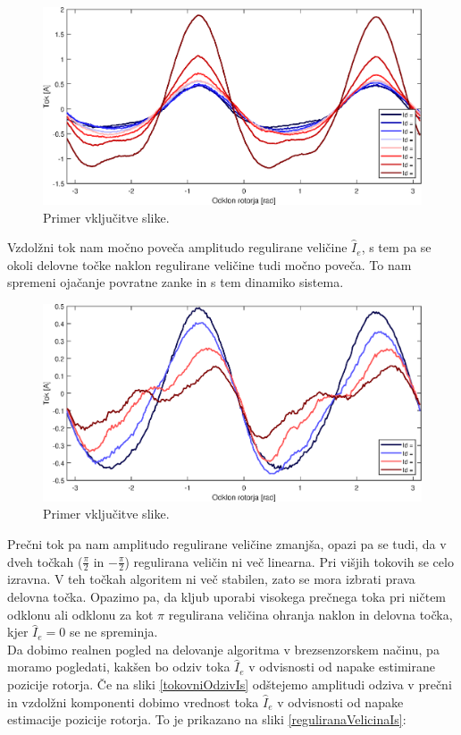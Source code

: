 \documentclass[a4paper,twoside,openright,12pt,slovene]{book}
\begin{document}
\begin{figure}[!htbp]
    \centering
    \includegraphics[width=1\columnwidth]{Slike/reguliranaVelicinaId.eps}
    \caption{\label{reguliranaVelicinaId} Primer vključitve slike.}
\end{figure}


Vzdolžni tok nam močno poveča amplitudo regulirane veličine $\hat{I}_{e}$, s tem pa se okoli delovne točke naklon regulirane veličine tudi močno poveča. To nam spremeni ojačanje povratne zanke in s
tem dinamiko sistema.

\begin{figure}[!htbp]
    \centering
    \includegraphics[width=01\columnwidth]{Slike/reguliranaVelicinaIq.eps}
    \caption{\label{reguliranaVelicinaIq} Primer vključitve slike.}
\end{figure}

Prečni tok pa nam amplitudo regulirane veličine zmanjša, opazi pa se tudi, da v dveh točkah ($\frac{\pi}{2}$ in $-\frac{\pi}{2}$) regulirana veličin ni več linearna. Pri višjih tokovih se celo izravna.
V teh točkah algoritem ni več stabilen, zato se mora izbrati prava delovna točka.
Opazimo pa, da kljub uporabi visokega prečnega toka pri ničtem odklonu ali odklonu za kot $\pi$ regulirana veličina ohranja naklon in delovna točka, kjer $\hat{I}_{e} = 0$ se ne spreminja.
\\
Da dobimo realnen pogled na delovanje algoritma v brezsenzorskem načinu, pa moramo pogledati, kakšen bo odziv toka $\hat{I}_{e}$ v odvisnosti od napake estimirane pozicije rotorja. Če na sliki
\ref{tokovniOdzivIs} odštejemo amplitudi odziva v prečni in vzdolžni komponenti dobimo vrednost toka $\hat{I}_{e}$ v odvisnosti od napake estimacije pozicije rotorja. To je prikazano na sliki
\ref{reguliranaVelicinaIs}:
\end{document}
